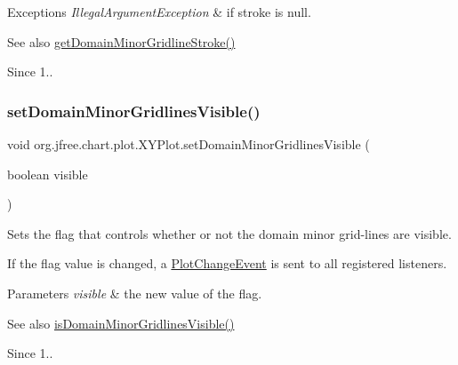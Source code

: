 \begin{DoxyExceptions}{Exceptions}
{\em Illegal\+Argument\+Exception} & if {\ttfamily stroke} is {\ttfamily null}.\\
\hline
\end{DoxyExceptions}
\begin{DoxySeeAlso}{See also}
\mbox{\hyperlink{classorg_1_1jfree_1_1chart_1_1plot_1_1_x_y_plot_ad020183a555cde4dfb3ea617cf32f10d}{get\+Domain\+Minor\+Gridline\+Stroke()}}
\end{DoxySeeAlso}
\begin{DoxySince}{Since}
1.. 
\end{DoxySince}
\mbox{\label{classorg_1_1jfree_1_1chart_1_1plot_1_1_x_y_plot_a1ebc5cb4d9ff174ef5bec54ac9f60377}} 
\subsubsection{\texorpdfstring{set\+Domain\+Minor\+Gridlines\+Visible()}{setDomainMinorGridlinesVisible()}}
{\footnotesize\ttfamily void org.\+jfree.\+chart.\+plot.\+X\+Y\+Plot.\+set\+Domain\+Minor\+Gridlines\+Visible (\begin{DoxyParamCaption}\item[{boolean}]{visible }\end{DoxyParamCaption})}

Sets the flag that controls whether or not the domain minor grid-\/lines are visible. 

If the flag value is changed, a \mbox{\hyperlink{}{Plot\+Change\+Event}} is sent to all registered listeners.


\begin{DoxyParams}{Parameters}
{\em visible} & the new value of the flag.\\
\hline
\end{DoxyParams}
\begin{DoxySeeAlso}{See also}
\mbox{\hyperlink{classorg_1_1jfree_1_1chart_1_1plot_1_1_x_y_plot_a90a77c4453eaa2e5f90b08285bdcc457}{is\+Domain\+Minor\+Gridlines\+Visible()}}
\end{DoxySeeAlso}
\begin{DoxySince}{Since}
1.. 
\end{DoxySince}
\mbox{\label{classorg_1_1jfree_1_1chart_1_1plot_1_1_x_y_plot_ac17e70d886ecf38c157b70c1d9f81d8c}} 
